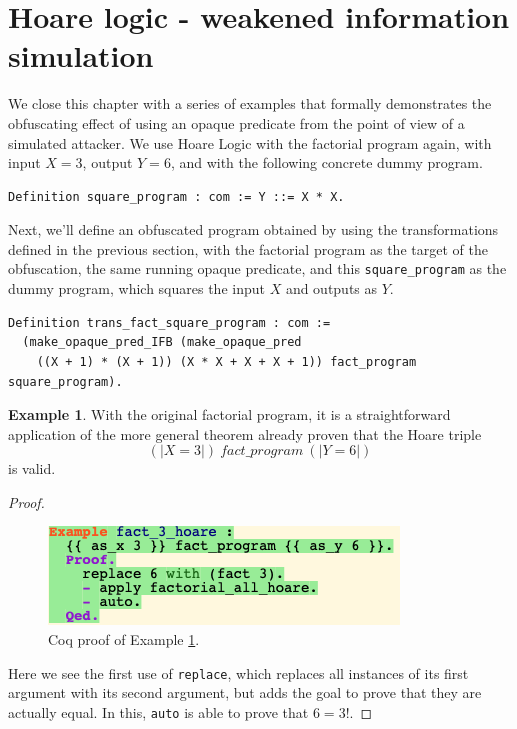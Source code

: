\documentclass[12pt,notitlepage]{report}
\theoremstyle{plain}
\theoremstyle{definition}
\newtheorem{example}[theo]{Example}
\numberwithin{equation}{section}
\begin{document}
\section{Hoare logic - weakened information simulation}\label{weakened}

We close this chapter with a series of examples that formally demonstrates the obfuscating effect of using an opaque predicate from the point of view of a simulated attacker.  We use Hoare Logic with the factorial program again, with input $X=3$, output $Y=6$, and with the following concrete dummy program.

\begin{verbatim}
Definition square_program : com := Y ::= X * X.
\end{verbatim}

Next, we'll define an obfuscated program obtained by using the transformations defined in the previous section, with the factorial program as the target of the obfuscation, the same running opaque predicate, and this \verb$square_program$ as the dummy program, which squares the input $X$ and outputs as $Y$.

\begin{verbatim}
Definition trans_fact_square_program : com :=
  (make_opaque_pred_IFB (make_opaque_pred 
    ((X + 1) * (X + 1)) (X * X + X + X + 1)) fact_program square_program).
\end{verbatim}

\begin{example}\label{hoare21}
    With the original factorial program, it is a straightforward application of the more general theorem already proven that the Hoare triple \[(|X=3|)\ fact\_program\ (|Y=6|)\] is valid.
    \begin{proof} 
    \noindent        \begin{figure}[H]
        \centering
        \includegraphics[scale=0.6]{hoare21}
        \caption{Coq proof of Example \ref{hoare21}.}
        \label{fig:hoare21}
        \end{figure}
    
    Here we see the first use of \verb$replace$, which replaces all instances of its first argument with its second argument, but adds the goal to prove that they are actually equal.  In this, \verb$auto$ is able to prove that $6=3!$.
    \end{proof}
\end{example}
\end{document}
